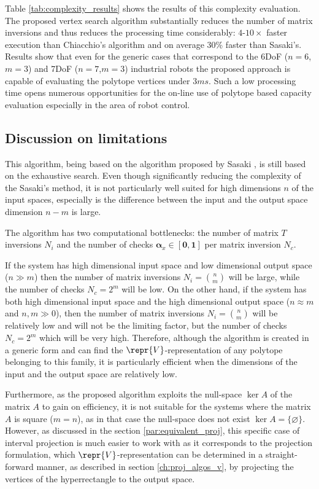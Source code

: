 Table \ref{tab:complexity_results} shows the results of this complexity evaluation. The proposed vertex search algorithm substantially reduces the number of matrix inversions and thus reduces the processing time considerably: $4$-$10\times$ faster execution than Chiacchio's algorithm and on average 30\% faster than Sasaki's. Results show that even for the generic cases that correspond to the 6DoF ($n=6$,$m=3$) and 7DoF ($n=7$,$m=3$) industrial robots the proposed approach is capable of evaluating the polytope vertices under $3ms$. Such a low processing time opens numerous opportunities for the on-line use of polytope based capacity evaluation especially in the area of robot control.

\subsection{Discussion on limitations}
This algorithm, being based on the algorithm proposed by Sasaki \cite{sasaki2011vertex}, is still based on the exhaustive search. Even though significantly reducing the complexity of the Sasaki's method, it is not particularly well suited for high dimensions $n$ of the input spaces, especially is the difference between the input and the output space dimension $n\!-\!m$ is large. 

The algorithm has two computational bottlenecks: the number of matrix $T$ inversions $N_i$ and the number of checks $\bm{\alpha}_x \in [\bm{0},\bm{1}]$ per matrix inversion $N_c$.

If the system has high dimensional input space and low dimensional output space ($n\gg m$) then the number of matrix inversions $N_i=\binom{n}{m}$ will be large, while the number of checks $N_c=2^m$  will be low. 
On the other hand, if the system has both high dimensional input space and the high dimensional output space ($n\approx m$ and $n,m\gg0$), then the number of matrix inversions $N_i=\binom{n}{m}$ will be relatively low and will not be the limiting factor, but the number of checks $N_c=2^m$ which will be very high. Therefore, although the algorithm is created in a generic form and can find the $\repr{V}$-representation of any polytope belonging to this family, it is particularly efficient when the dimensions of the input and the output space are relatively low. 

Furthermore, as the proposed algorithm exploits the null-space $\ker{A}$ of the matrix $A$ to gain on efficiency, it is not suitable for the systems where the matrix $A$ is square ($m\!=\!n$), as in that case the null-space does not exist $\ker{A}=\{\varnothing\}$. However, as discussed in the section \ref{par:equivalent_proj}, this specific case of interval projection is much easier to work with as it corresponds to the projection formulation, which $\repr{V}$-representation can be determined in a straight-forward manner, as described in section \ref{ch:proj_algos_v}, by projecting the vertices of the hyperrectangle to the output space.


